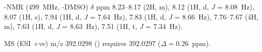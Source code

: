 \begin{refsection}
-NMR (499~MHz, -DMSO) $\delta$ ppm 8.23--8.17 (2H, m), 8.12 (1H, d, \emph{J} = 8.08~Hz), 8.07 (1H, s), 7.94 (1H, d, \emph{J} = 7.64~Hz), 7.83 (1H, d, \emph{J} = 8.66~Hz), 7.76--7.67 (4H, m), 7.63 (1H, d, \emph{J} = 8.63~Hz), 7.51 (1H, t, \emph{J} = 7.34~Hz).

MS (ESI +ve) m/z 392.0298 ()  requires 392.0297 ($\Delta=0.26$~ppm).

\end{refsection}
